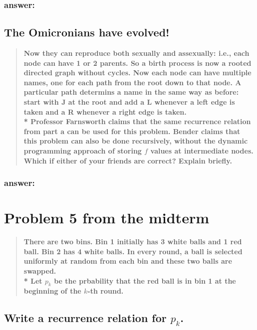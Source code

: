 \documentclass[titlepage]{article}\usepackage[]{graphicx}\usepackage[]{color}
\begin{document}
\subsubsection{answer:}
\vspace{5cm}



\subsection{The Omicronians have evolved!} 
\begin{quote}
  \textbf{Now they can reproduce both sexually
	and assexually: i.e., each node can have 1 or 2 parents. So a birth process
	is now a rooted directed graph without cycles. Now each node can have
	multiple names, one for each path from the root down to that node. A
	particular path determins a name in the same way as before: start with J at
	the root and add a L whenever a left edge is taken and a R whenever a right
	edge is taken. \\*
	Professor Farnsworth claims that the same recurrence relation from part a
	can be used for this problem. Bender claims that this problem can also be
	done recursively, without the dynamic programming approach of storing $f$
	values at intermediate nodes. Which if either of your friends are correct?
	Explain briefly.}
\end{quote}
\subsubsection{answer: }
\vspace{8cm}





\section{Problem 5 from the midterm}
\begin{quote}
  \textbf{There are two bins. Bin 1 initially has 3 white balls and 1 red ball.
  Bin 2 has 4 white balls. In every round, a ball is selected uniformly at
  random from each bin and these two balls are swapped. \\*
  Let $p_k$ be the prbability that the red ball is in bin 1 at the beginning of
  the $k$-th round.}
\end{quote}

\subsection{ Write a recurrence relation for $p_k$. }
\vspace{4cm}
\end{document}
